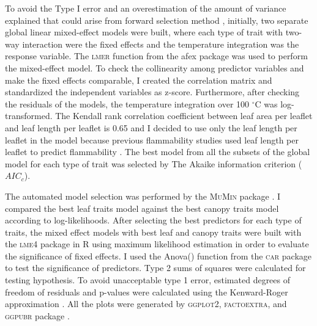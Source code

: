 \documentclass{ttuthes2007}
\newcommand{\pkg}[1]{\textsc{#1}}
\begin{document}

To avoid the  Type I error and an overestimation of the amount of variance explained that could arise from forward selection method \citep{blanchet2008forward}, initially, two separate global linear mixed-effect models were built, where each type of trait with two-way interaction were the fixed effects and the temperature integration was the response variable.
The \pkg{lmer} function from the afex package \citep{singmann2015packageafex,afexluke2017evaluating} was used to perform the mixed-effect model.
To check the collinearity among predictor variables and make the fixed effects comparable, I created the correlation matrix and standardized the independent variables as z-score. Furthermore, after checking the residuals of the models, the temperature integration over 100 $^{\circ}$C was log-transformed. 
The Kendall rank correlation coefficient between leaf area per leaflet and leaf length per leaflet is 0.65 and I decided to use only the leaf length per leaflet in the model because previous flammability studies used leaf length per leaflet to predict flammability \citep{alam2020shoot}. 
The best model from all the subsets of the global model for each type of trait was selected by The Akaike information criterion ($AIC_{c}$).

The automated model selection was performed by the \pkg{MuMin} package \citep{barton2015packagemumin}. I compared the best leaf traits model against the best canopy traits model according to log-likelihoods. After selecting the best predictors for each type of traits, the mixed effect models with best leaf and canopy traits were built with the \pkg{lme4} package in R \citep{bates2009package} using maximum likelihood estimation in order to evaluate the significance of fixed effects. I used the Anova() function from the \pkg{car} package \citep{fox2013hypothesis} to test the significance of predictors. Type  2  sums  of  squares  were  calculated  for  testing  hypothesis. To avoid unacceptable type 1 error, estimated degrees of freedom of residuals and p-values were calculated using the Kenward-Roger approximation \citep{kenward1997small}. All the plots were generated by \pkg{ggplot2}, \pkg{factoextra}, and \pkg{ggpubr} package \citep{wickham2016packageggplot2, kassambara2017packagefactoextra,kassambara2020package}.
\end{document}
